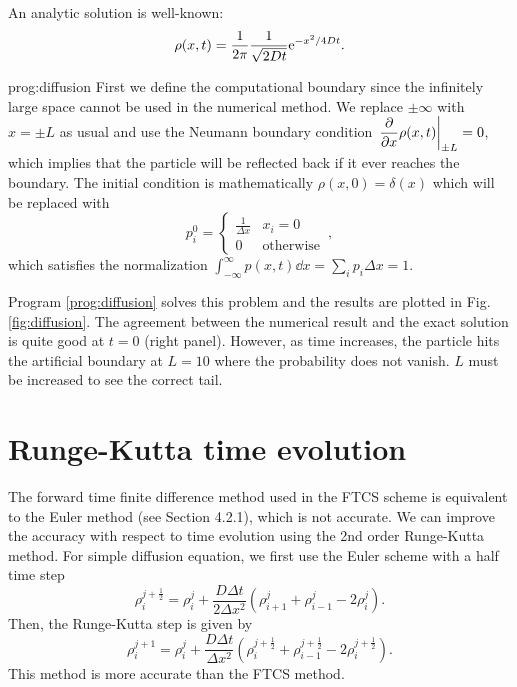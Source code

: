 \begin{example}
An analytic solution is well-known:
\begin{equation}
\rho(x,t) = \frac{1}{2\pi} \frac{1}{\sqrt{2 D t}} \text{e}^{-x^2/4 D t}.
\end{equation}


prog:diffusion
First we define the computational  boundary since the infinitely large space cannot be used in the numerical method.   We replace $\pm \infty$ with $x=\pm L$ as usual and use the Neumann boundary
condition $\eval{\displaystyle\pdv{x}\rho(x,t)}_{\pm L}=0$, which implies that the particle will be reflected back if it ever reaches the boundary.  The initial condition is mathematically $\rho(x,0)=\delta(x)$ which will be replaced with 
\[
p_i^0 = \begin{cases} \frac{1}{\Delta x} & x_i = 0 \\ 0 & \text{otherwise}\end{cases}\,,
\]
which satisfies the normalization $\displaystyle\int_{-\infty}^{\infty} p(x,t) \dd{x} = \sum_i p_i \Delta x = 1$.

Program \ref{prog:diffusion} solves this problem and the results are plotted in Fig. \ref{fig:diffusion}.  The agreement between the numerical result and the exact solution is quite good at $t=0$ (right panel).  However, as time increases, the particle hits the artificial boundary at $L=10$ where the probability does not vanish.  $L$ must be increased to see the correct tail.

\end{example}

\noindent
\section{Runge-Kutta time evolution}

The forward time finite difference method used in the FTCS scheme is equivalent to the Euler method (see Section 4.2.1), which is not accurate. We can improve the accuracy with respect to time evolution using the 2nd order Runge-Kutta method.
For simple diffusion equation, we first use the Euler scheme with a half time step
\begin{equation}
\rho^{j+\frac{1}{2}}_i = \rho^j_i + \frac{D \Delta t}{2\Delta x^2} \left ( \rho^j_{i+1} + \rho^j_{i-1} - 2 \rho^j_i \right ).
\end{equation}
Then, the Runge-Kutta step is given by
\begin{equation}
\rho^{j+1}_i = \rho^j_i + \frac{D \Delta t}{\Delta x^2} \left ( \rho^{j+\frac{1}{2}}_{i} + \rho^{j+\frac{1}{2}}_{i-1} - 2 \rho^{j+\frac{1}{2}}_i \right ).
\end{equation}
This method is more accurate than the FTCS method.

